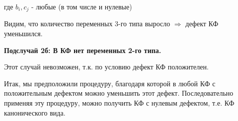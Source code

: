 где $b_i, c_j$ - любые (в том числе и нулевые)

Видим, что количество переменных 3-го типа выросло $\Rightarrow$ дефект КФ уменьшился.

\bigbreak

\textbf{Подслучай 2б: В КФ нет переменных 2-го типа.}

Этот случай невозможен, т.к. по условию дефект КФ положителен.
\bigbreak

Итак, мы предположили процедуру, благодаря которой в любой КФ с положительным дефектом можно уменьшить этот дефект. Последовательно применяя эту процедуру, можно получить КФ с нулевым дефектом, т.е. КФ канонического вида.
